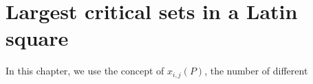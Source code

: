 \documentclass[12pt]{report}
\def\lcs#1{{\rm lcs}$(#1)$}
\begin{document}
\chapter{Largest critical sets in a Latin square}\label{ch4}
%
%
%
%
\def\n#1{\vbox to 3mm{\vspace{1mm}\vfill \hbox to 2.0mm{\hfill
             $#1$\hfill} \vfill }}
\def\arraystretch{1.0}                 %
\pagestyle{plain}
%
%
%
%
In this chapter, we use the concept of $x_{i,j}(P)$, the number of different
\end{document}
